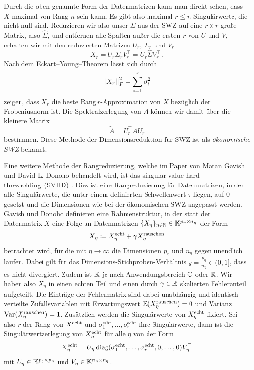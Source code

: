 \documentclass[../Bachelor_LennartKoliwer.tex]{subfiles}
\begin{document}
Durch die oben genannte Form der Datenmatrizen kann man direkt sehen, dass $X$ maximal von Rang $n$ sein kann. 
Es gibt also maximal $r\leq n$ Singulärwerte, die nicht null sind. 
Reduzieren wir also unser $\Sigma$ aus der SWZ auf eine $r\times r$ große Matrix, also $\hat{\Sigma}$, und entfernen alle Spalten außer die ersten $r$ von $U$ und $V$, erhalten wir mit den reduzierten Matrizen $U_r$, $\Sigma_r$ und $V_r$
\[
X_r=U_r\Sigma_rV_r^\top=U_r\hat{\Sigma}V_r^\top\,.
\] 
Nach dem Eckart--Young--Theorem \cite[9]{SlaySlaySlay} lässt sich durch
\begin{align*}
    \left\vert\left\vert X_r \right\vert\right\vert_F^2=\sum_{i=1}^{r}\sigma_i^2
\end{align*}
zeigen, dass $X_r$ die beste Rang$\,r$-Approximation von $X$ bezüglich der Frobeniusnorm ist.
Die Spektralzerlegung von $A$ können wir damit über die kleinere Matrix
\[
    \tilde{A}=U_r^\top AU_r
\]
bestimmen.
Diese Methode der Dimensionsreduktion für SWZ ist als \emph{ökonomische SWZ} bekannt.




Eine weitere Methode der Rangreduzierung, welche im Paper von Matan Gavish und David L. Donoho behandelt wird, ist das \glqq singular value hard thresholding\grqq\ (SVHD) \cite{OHT}. 
Dies ist eine Rang\-reduzierung für Datenmatrizen, in der alle Singulärwerte, die unter einem definierten Schwellenwert $\tau$ liegen, auf $0$ gesetzt und die Dimensionen wie bei der ökonomischen SWZ angepasst werden.
Gavish und Donoho definieren eine Rahmenstruktur, in der statt der Datenmatrix $X$ eine Folge an Datenmatrizen ${\{X_\eta\}_{\eta\in\mathbb{N}}\in \mathbb{K}^{p_\eta\times n_\eta}}$ der Form
\[
    X_\eta \coloneqq X^\text{echt}_\eta+\gamma X^\text{rauschen}_\eta 
\]
betrachtet wird, für die mit $\eta\to\infty$ die Dimensionen $p_\eta$ und $n_\eta$ gegen unendlich laufen.
Dabei gilt für das Dimensions-Stichproben-Verhältnis $y=\frac{p_\eta}{n_\eta}\in (0,1]$, dass es nicht divergiert.
Zudem ist $\mathbb{K}$ je nach Anwendungsbereich $\mathbb{C}$ oder $\mathbb{R}$.
Wir haben also $X_\eta$ in einen echten Teil und einen durch $\gamma\in\mathbb{R}$ skalierten Fehleranteil aufgeteilt. 
Die Einträge der Fehlermatrix sind dabei unabhängig und identisch verteilte Zufallsvariablen mit Erwartungswert $\mathbb{E}(X^\text{rauschen}_\eta)=0$ und Varianz $\operatorname{Var}(X^\text{rauschen}_\eta)=1$.
Zusätzlich werden die Singulärwerte von $X^\text{echt}_\eta$ fixiert.
Sei also $r$ der Rang von $X^\text{echt}$ und $\sigma_1^{\text{echt}},\dots,\sigma_r^{\text{echt}}$ ihre Singulärwerte, dann ist die Singulärwertzerlegung von $X^\text{echt}_\eta$ für alle $\eta$ von der Form
\begin{align}
    X^\text{echt}_\eta = U_\eta\operatorname{diag}(\sigma_1^{\text{echt}},\dots,\sigma_r^{\text{echt}},0,\dots,0)V^\top_\eta \label{eq:Singulärwertzerlegung_Xtrue}
\end{align}
mit $U_\eta\in\mathbb{K}^{p_\eta\times p_\eta}$ und $V_\eta\in\mathbb{K}^{n_\eta\times n_\eta}$.
\end{document}
